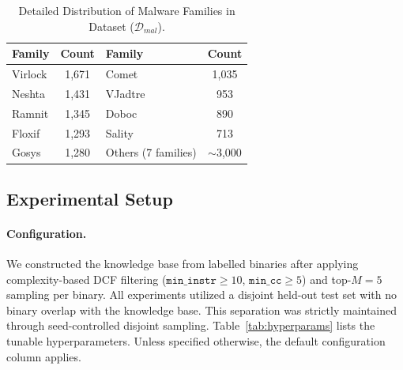 \documentclass[pdflatex,sn-mathphys-num]{sn-jnl}
\begin{document}
\begin{table}[h]
    \centering
    \scriptsize
    \caption{Detailed Distribution of Malware Families in Dataset ($\mathcal{D}_{mal}$).}
    \label{tab:families}
    \begin{tabular}{lclc}
    \toprule
    \textbf{Family} & \textbf{Count} & \textbf{Family} & \textbf{Count} \\
    \midrule
    Virlock & 1,671 & Comet & 1,035 \\
    Neshta & 1,431 & VJadtre & 953 \\
    Ramnit & 1,345 & Doboc & 890 \\
    Floxif & 1,293 & Sality & 713 \\
    Gosys & 1,280 & Others (7 families) & $\sim$3,000 \\
    \bottomrule
    \end{tabular}
\end{table}




\subsection{Experimental Setup}
\label{sec:eval_setup}

\paragraph{Configuration.}
We constructed the knowledge base from labelled binaries after applying complexity-based DCF filtering ($\texttt{min\_instr} \geq 10$, $\texttt{min\_cc} \geq 5$) and top-$M{=}5$ sampling per binary. All experiments utilized a disjoint held-out test set with no binary overlap with the knowledge base. This separation was strictly maintained through seed-controlled disjoint sampling. Table~\ref{tab:hyperparams} lists the tunable hyperparameters. Unless specified otherwise, the default configuration column applies.
\end{document}
